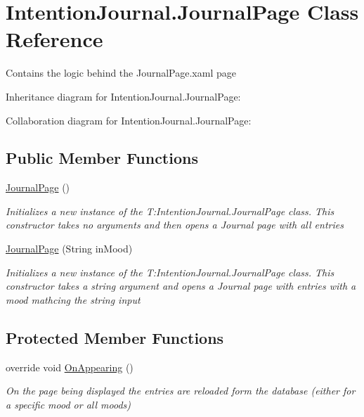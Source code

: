 \hypertarget{class_intention_journal_1_1_journal_page}{}\section{Intention\+Journal.\+Journal\+Page Class Reference}
\label{class_intention_journal_1_1_journal_page}


Contains the logic behind the Journal\+Page.\+xaml page  




Inheritance diagram for Intention\+Journal.\+Journal\+Page\+:


Collaboration diagram for Intention\+Journal.\+Journal\+Page\+:
\subsection*{Public Member Functions}
\begin{DoxyCompactItemize}
\item 
\hyperlink{class_intention_journal_1_1_journal_page_a7c92e3a38e307184a108336aff83771f}{Journal\+Page} ()
\begin{DoxyCompactList}\small\item\em Initializes a new instance of the T\+:\+Intention\+Journal.\+Journal\+Page class. This constructor takes no arguments and then opens a Journal page with all entries \end{DoxyCompactList}\item 
\hyperlink{class_intention_journal_1_1_journal_page_a68635fe99822750ef9235610ce0a882e}{Journal\+Page} (String in\+Mood)
\begin{DoxyCompactList}\small\item\em Initializes a new instance of the T\+:\+Intention\+Journal.\+Journal\+Page class. This constructor takes a string argument and opens a Journal page with entries with a mood mathcing the string input \end{DoxyCompactList}\end{DoxyCompactItemize}
\subsection*{Protected Member Functions}
\begin{DoxyCompactItemize}
\item 
override void \hyperlink{class_intention_journal_1_1_journal_page_a6ad723713090dd3d7571c71ed53c5568}{On\+Appearing} ()
\begin{DoxyCompactList}\small\item\em On the page being displayed the entries are reloaded form the database (either for a specific mood or all moods) \end{DoxyCompactList}\end{DoxyCompactItemize}

